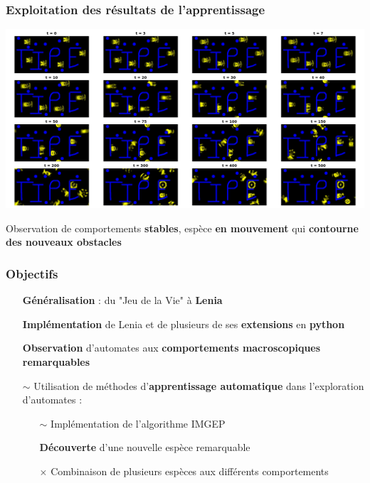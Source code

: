 \documentclass[aspectratio=43]{beamer}
\begin{document}
\begin{frame}
	\frametitle{Exploitation des r\'esultats de l'apprentissage}

	\begin{center}
		\includegraphics[width=\textwidth]{evolution_machine_learning.png}

		Observation de comportements \textbf{stables}, esp\`ece \textbf{en mouvement} qui \textbf{contourne des nouveaux obstacles}
	\end{center}

\end{frame}
\begin{frame}
    \frametitle{Objectifs}

    \begin{itemize}
        \item[\checkmark] \textbf{Généralisation} : du "Jeu de la Vie" à \textbf{Lenia}  
        \item[\checkmark] \textbf{Implémentation} de Lenia et de plusieurs de ses \textbf{extensions} en \textbf{python} \faPython
        \item[\checkmark] \textbf{Observation} d'automates aux \textbf{comportements macroscopiques remarquables}
        \item[$\sim$] Utilisation de méthodes d'\textbf{apprentissage automatique} dans l'exploration d'automates :
            \begin{itemize}
                \item[$\sim$] Implémentation de l'algorithme IMGEP
                \item[\checkmark] \textbf{Découverte} d'une nouvelle espèce remarquable
                \item[$\times$] Combinaison de plusieurs espèces aux différents comportements 
            \end{itemize}
    \end{itemize}

\end{frame}
\end{document}
